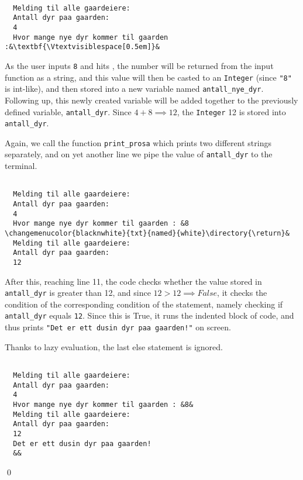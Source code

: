 \documentclass{myassignment}
\renewenvironment{answer}%
{%
\vspace{0.1 in}
\begin{boldmath}
\begin{emph}
{%
}
}%
{%
\end{emph}
\end{boldmath}
\qed
}
\newcommand\Vtextvisiblespace[1][.3em]{%
  \mbox{\kern.06em\vrule height.3ex}%
  \vbox{\hrule width#1}%
  \hbox{\vrule height.3ex}}
\begin{document}
\begin{answer}
\begin{lstlisting}[style=custombash]

  Melding til alle gaardeiere:
  Antall dyr paa gaarden: 
  4
  Hvor mange nye dyr kommer til gaarden :&\textbf{\Vtextvisiblespace[0.5em]}&
\end{lstlisting}

As the user inputs \texttt{8} and hits \keys{\return}, the number will be returned from the input function as a string, and this value will then be casted to an \texttt{Integer} (since \texttt{"8"} is int-like), and then stored into a new variable named \texttt{antall\_nye\_dyr}. Following up, this newly created variable will be added together to the previously defined variable, \texttt{antall\_dyr}. Since $4 + 8 \implies 12$, the \texttt{Integer} 12 is stored into \texttt{antall\_dyr}.

Again, we call the function \texttt{print\_prosa} which prints two different strings separately, and on yet another line we pipe the value of \texttt{antall\_dyr} to the terminal.

\begin{lstlisting}[style=custombash]

  Melding til alle gaardeiere:
  Antall dyr paa gaarden: 
  4
  Hvor mange nye dyr kommer til gaarden : &8 \changemenucolor{blacknwhite}{txt}{named}{white}\directory{\return}&
  Melding til alle gaardeiere:
  Antall dyr paa gaarden: 
  12
\end{lstlisting}

After this, reaching line 11, the code checks whether the value stored in \texttt{antall\_dyr} is greater than 12, and since $ 12 > 12 \implies False$, it checks the condition of the corresponding condition of the statement, namely checking if \texttt{antall\_dyr} equals \texttt{12}. Since this is True, it runs the indented block of code, and thus prints \texttt{"Det er ett dusin dyr paa gaarden!"} on screen.

Thanks to lazy evaluation, the last else statement is ignored.
\begin{lstlisting}[style=custombash]

  Melding til alle gaardeiere:
  Antall dyr paa gaarden: 
  4
  Hvor mange nye dyr kommer til gaarden : &8&
  Melding til alle gaardeiere:
  Antall dyr paa gaarden: 
  12
  Det er ett dusin dyr paa gaarden!
  &&
\end{lstlisting}

\end{answer}
\end{document}
